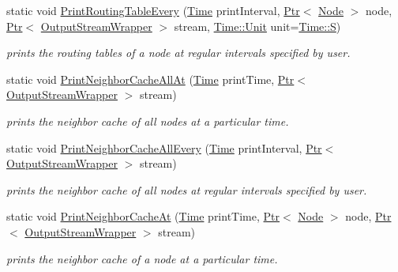 \begin{DoxyCompactItemize}
static void \hyperlink{classns3_1_1Ipv4RoutingHelper_ae2af473c43fc96aecd689072887d7dce}{Print\+Routing\+Table\+Every} (\hyperlink{classns3_1_1Time}{Time} print\+Interval, \hyperlink{classns3_1_1Ptr}{Ptr}$<$ \hyperlink{classns3_1_1Node}{Node} $>$ node, \hyperlink{classns3_1_1Ptr}{Ptr}$<$ \hyperlink{classns3_1_1OutputStreamWrapper}{Output\+Stream\+Wrapper} $>$ stream, \hyperlink{classns3_1_1Time_a87a7f4d29c68b047a72d291ad660295a}{Time\+::\+Unit} unit=\hyperlink{classns3_1_1Time_a87a7f4d29c68b047a72d291ad660295aade8622b06524a328cd3a59db6ccf76af}{Time\+::S})
\begin{DoxyCompactList}\small\item\em prints the routing tables of a node at regular intervals specified by user. \end{DoxyCompactList}\item 
static void \hyperlink{classns3_1_1Ipv4RoutingHelper_ab74b74f056874f2058c1a1b2e0573049}{Print\+Neighbor\+Cache\+All\+At} (\hyperlink{classns3_1_1Time}{Time} print\+Time, \hyperlink{classns3_1_1Ptr}{Ptr}$<$ \hyperlink{classns3_1_1OutputStreamWrapper}{Output\+Stream\+Wrapper} $>$ stream)
\begin{DoxyCompactList}\small\item\em prints the neighbor cache of all nodes at a particular time. \end{DoxyCompactList}\item 
static void \hyperlink{classns3_1_1Ipv4RoutingHelper_ab9a6ef81b586a23f92fc1595c52661de}{Print\+Neighbor\+Cache\+All\+Every} (\hyperlink{classns3_1_1Time}{Time} print\+Interval, \hyperlink{classns3_1_1Ptr}{Ptr}$<$ \hyperlink{classns3_1_1OutputStreamWrapper}{Output\+Stream\+Wrapper} $>$ stream)
\begin{DoxyCompactList}\small\item\em prints the neighbor cache of all nodes at regular intervals specified by user. \end{DoxyCompactList}\item 
static void \hyperlink{classns3_1_1Ipv4RoutingHelper_a6cbcf152538f660d62508ca5e398a982}{Print\+Neighbor\+Cache\+At} (\hyperlink{classns3_1_1Time}{Time} print\+Time, \hyperlink{classns3_1_1Ptr}{Ptr}$<$ \hyperlink{classns3_1_1Node}{Node} $>$ node, \hyperlink{classns3_1_1Ptr}{Ptr}$<$ \hyperlink{classns3_1_1OutputStreamWrapper}{Output\+Stream\+Wrapper} $>$ stream)
\begin{DoxyCompactList}\small\item\em prints the neighbor cache of a node at a particular time. \end{DoxyCompactList}\item 

\end{DoxyCompactItemize}
